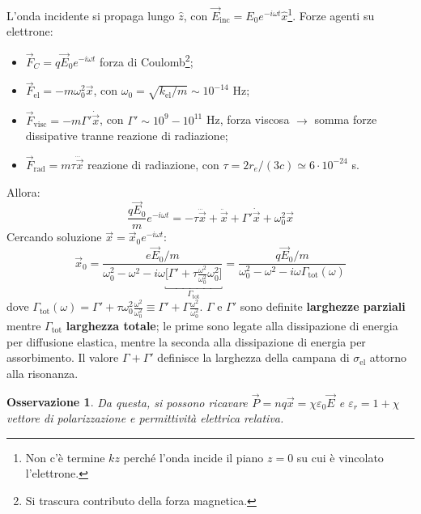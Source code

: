\documentclass[10pt, a4paper]{scrartcl}
\numberwithin{equation}{subsection}
\theoremstyle{style1}
\newtheorem{osservazione}{Osservazione}[section]
\begin{document}
L'onda incidente si propaga lungo $\hat{z}$, con $\vec{E}_\text{inc} = E_0 e^{-i\omega t} \hat{x}$\footnote{Non c'\`e termine $kz$ perch\'e l'onda incide il piano $z=0$ su cui \`e vincolato l'elettrone.}. Forze agenti su elettrone:
\begin{itemize}
	\item $\vec{F}_C = q \vec{E}_0 e^{-i\omega t} $ forza di Coulomb\footnote{Si trascura contributo della forza magnetica.};
	\item $\vec{F}_\text{el}= -m\omega_0^2 \vec{x}$, con $\omega_0 = \sqrt{k_\text{el} / m} \sim 10^{-14 } $ Hz;
	\item $\vec{F}_\text{visc} = -m\Gamma ' \dot{\vec{x}}$, con $\Gamma ' \sim 10^{9} - 10^{11} $ Hz, forza viscosa $\to$ somma forze dissipative tranne reazione di radiazione;
	\item $\vec{F}_\text{rad}= m\tau \dddot{\vec{x}}$ reazione di radiazione, con $\tau  = 2r_e /(3c)\simeq 6 \cdot 10^{-24} $ s.
\end{itemize}
Allora: 
\begin{equation}\label{ele}
\frac{q \vec{E}_0}{m} e^{-i\omega t} = - \tau \dddot{\vec{x}} + \ddot{\vec{x}} + \Gamma ' \dot{\vec{x}}+ \omega_0^2 \vec{x}
\end{equation}
Cercando soluzione $\vec{x}= \vec{x}_0 e^{-i\omega t}$:
\begin{equation}
	\vec{x}_0 = \frac{e\vec{E}_0 / m}{\omega_0^2 - \omega ^2 - i\omega \underbracket{\bigg[ \Gamma ' + \tau \frac{\omega^2}{\omega_0^2} \omega_0^2 \bigg] }_{ \Gamma_\text{tot}}} = \frac{q \vec{E}_0 / m}{\omega_0^2 - \omega^2 - i\omega \Gamma_\text{tot}(\omega)}
\end{equation}
dove $\Gamma_\text{tot}(\omega) = \Gamma' + \tau \omega_0^2 \frac{\omega^2}{\omega_0^2}\equiv \Gamma' + \Gamma \frac{\omega^2}{\omega_0^2}$. $\Gamma$ e $\Gamma'$ sono definite \textbf{larghezze parziali} mentre $\Gamma_\text{tot}$ \textbf{larghezza totale}; le prime sono legate alla dissipazione di energia per diffusione elastica, mentre la seconda alla dissipazione di energia per assorbimento. Il valore $\Gamma + \Gamma'$ definisce la larghezza della campana di $\sigma _\text{el}$ attorno alla risonanza.
\begin{osservazione}
	Da questa, si possono ricavare $\vec{P}= nq \vec{x}= \chi \varepsilon _0 \vec{E}$ e $\varepsilon _r = 1+ \chi $ vettore di polarizzazione e permittivit\`a elettrica relativa.
\end{osservazione}
\end{document}
